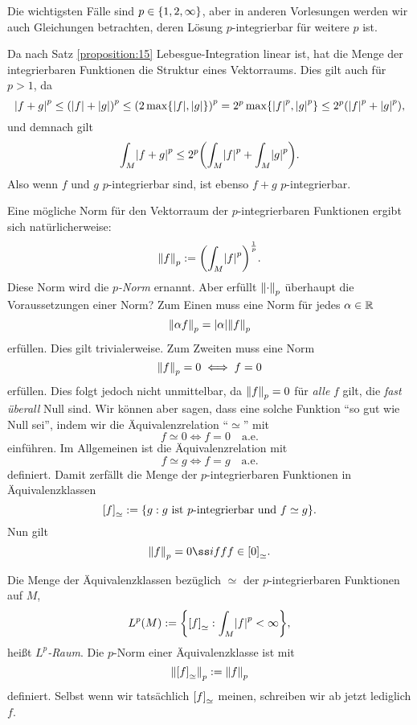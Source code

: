Die wichtigsten Fälle sind \(p \in \braces*{1, 2, \infty}\), aber in anderen Vorlesungen werden wir auch Gleichungen betrachten, deren Lösung \(p\)-integrierbar für weitere \(p\) ist.

Da nach Satz \ref{proposition:15} Lebesgue-Integration linear ist, hat die Menge der integrierbaren Funktionen die Struktur eines Vektorraums.
Dies gilt auch für \(p > 1\), da
\[
	\absolute*{f + g}^p \le \parentheses*{\absolute*{f} + \absolute*{g}}^p \le \parentheses*{2\max\braces*{\absolute*{f}, \absolute*{g}}}^p = 2^p \max\braces*{\absolute*{f}^p, \absolute*{g}^p} \le 2^p \parentheses*{\absolute*{f}^p + \absolute*{g}^p},
\]
und demnach gilt
\[
	\int_M \absolute*{f + g}^p \le 2^p \parentheses*{\int_M \absolute*{f}^p + \int_M \absolute*{g}^p}.
\]
Also wenn \(f\) und \(g\) \(p\)-integrierbar sind, ist ebenso \(f + g\) \(p\)-integrierbar.

Eine mögliche Norm für den Vektorraum der \(p\)-integrierbaren Funktionen ergibt sich natürlicherweise:
\[
	\norm*{f}_p := \parentheses*{\int_M \absolute*{f}^p}^{\frac{1}{p}}.
\]
Diese Norm wird die \emph{\(p\)-Norm} ernannt.
Aber erfüllt \(\norm*{\cdot}_p\) überhaupt die Voraussetzungen einer Norm?
Zum Einen muss eine Norm für jedes \(\alpha \in \R\)
\[
	\norm*{\alpha f}_p = \absolute*{\alpha}\norm*{f}_p
\]
erfüllen.
Dies gilt trivialerweise.
Zum Zweiten muss eine Norm
\[
	\norm*{f}_p = 0 \iff f = 0
\]
erfüllen.
Dies folgt jedoch nicht unmittelbar, da \(\norm*{f}_p = 0\) für \emph{alle} \(f\) gilt, die \emph{fast überall} Null sind.
Wir können aber sagen, dass eine solche Funktion ``so gut wie Null sei'', indem wir die Äquivalenzrelation ``\(\simeq\)'' mit
\[
	f \simeq 0 \iff f = 0 \quad \text{a.e.}
\]
einführen.
Im Allgemeinen ist die Äquivalenzrelation mit
\[
	f \simeq g \iff f = g \quad \text{a.e.}
\]
definiert.
Damit zerfällt die Menge der \(p\)-integrierbaren Funktionen in Äquivalenzklassen
\[
	\brackets*{f}_\simeq := \braces*{g : g\text{ ist }p\text{-integrierbar und }f \simeq g}.
\]
Nun gilt
\[
	\norm*{f}_p = 0 ßiff f \in \brackets*{0}_\simeq.
\]

\begin{definition}[\(L^p\)-Raum]
	Die Menge der Äquivalenzklassen bezüglich \(\simeq\) der \(p\)-integrierbaren Funktionen auf \(M\),
	\[
		L^p\parentheses*{M} := \braces*{\brackets*{f}_\simeq : \int_M \absolute*{f}^p < \infty},
	\]
	heißt \emph{\(L^p\)-Raum}.
	Die \(p\)-Norm einer Äquivalenzklasse ist mit
	\begin{equation}
		\norm*{\brackets*{f}_\simeq}_p := \norm*{f}_p
	\end{equation}
	definiert.
	Selbst wenn wir tatsächlich \(\brackets*{f}_\simeq\) meinen, schreiben wir ab jetzt lediglich \(f\).
\end{definition}

